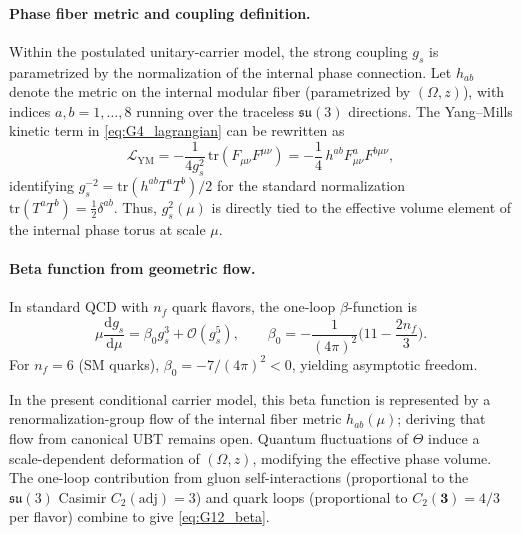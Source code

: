 \paragraph{Phase fiber metric and coupling definition.}
Within the postulated unitary-carrier model, the strong coupling $g_s$ is parametrized by the normalization of the internal phase connection. Let $h_{ab}$ denote the metric on the internal modular fiber (parametrized by $(\Omega,z)$), with indices $a,b=1,\ldots,8$ running over the traceless $\mathfrak{su}(3)$ directions. The Yang–Mills kinetic term in \eqref{eq:G4_lagrangian} can be rewritten as
\begin{equation}
\mathcal{L}_{\mathrm{YM}} = -\frac{1}{4g_s^2}\,\mathrm{tr}(F_{\mu\nu}F^{\mu\nu})
= -\frac{1}{4}\, h^{ab} F_{\mu\nu}^a F^{b\mu\nu},
\end{equation}
identifying $g_s^{-2} = \mathrm{tr}(h^{ab}T^a T^b)/2$ for the standard normalization $\mathrm{tr}(T^a T^b)=\frac{1}{2}\delta^{ab}$. Thus, $g_s^2(\mu)$ is directly tied to the effective volume element of the internal phase torus at scale $\mu$.

\paragraph{Beta function from geometric flow.}
In standard QCD with $n_f$ quark flavors, the one-loop $\beta$-function is
\begin{equation}
\label{eq:G12_beta}
\mu\frac{\mathrm{d}g_s}{\mathrm{d}\mu} = \beta_0 g_s^3 + \mathcal{O}(g_s^5),
\qquad 
\beta_0 = -\frac{1}{(4\pi)^2}\Big(11 - \frac{2n_f}{3}\Big).
\end{equation}
For $n_f=6$ (SM quarks), $\beta_0 = -7/(4\pi)^2 < 0$, yielding asymptotic freedom.

In the present conditional carrier model, this beta function is represented by a renormalization-group flow of the internal fiber metric $h_{ab}(\mu)$; deriving that flow from canonical UBT remains open. Quantum fluctuations of $\Theta$ induce a scale-dependent deformation of $(\Omega,z)$, modifying the effective phase volume. The one-loop contribution from gluon self-interactions (proportional to the $\mathfrak{su}(3)$ Casimir $C_2(\mathrm{adj})=3$) and quark loops (proportional to $C_2(\mathbf{3})=4/3$ per flavor) combine to give \eqref{eq:G12_beta}.

